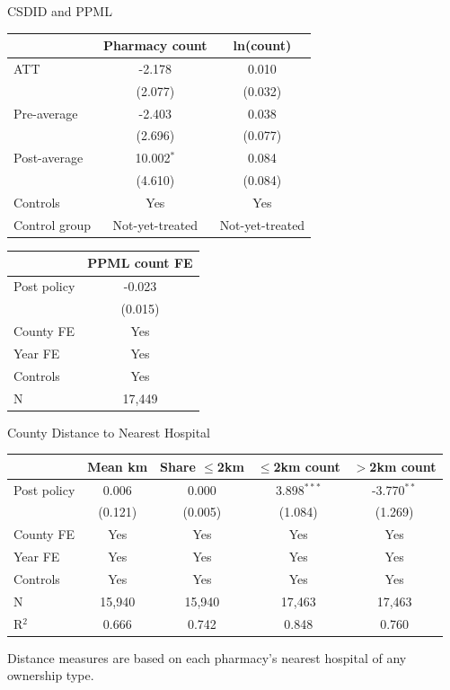 \documentclass{beamer}
\begin{document}
\begin{frame}{ CSDID and PPML}

\centering
\scriptsize
\setlength{\tabcolsep}{7pt}

\begin{tabular}{lcc}
\toprule
& Pharmacy count & ln(count) \\
\midrule
ATT
& -2.178 & 0.010 \\
& (2.077) & (0.032) \\
\addlinespace
Pre-average
& -2.403 & 0.038 \\
& (2.696) & (0.077) \\
\addlinespace
Post-average
& 10.002$^{*}$ & 0.084 \\
& (4.610) & (0.084) \\
\midrule
Controls & Yes & Yes \\
Control group & Not-yet-treated & Not-yet-treated \\
\bottomrule
\end{tabular}

\vspace{1em}

\begin{tabular}{lc}
\toprule
& PPML count FE \\
\midrule
Post policy
& -0.023 \\
& (0.015) \\
\midrule
County FE & Yes \\
Year FE & Yes \\
Controls & Yes \\
N & 17,449 \\
\bottomrule
\end{tabular}

\end{frame}

\begin{frame}{County Distance to Nearest Hospital}

\centering
\scriptsize
\setlength{\tabcolsep}{7pt}

\begin{tabular}{lcccc}
\toprule
& Mean km & Share $\leq$2km & $\leq$2km count & $>$2km count \\
\midrule
Post policy
& 0.006 & 0.000 & 3.898$^{***}$ & -3.770$^{**}$ \\
& (0.121) & (0.005) & (1.084) & (1.269) \\
\midrule
County FE & Yes & Yes & Yes & Yes \\
Year FE & Yes & Yes & Yes & Yes \\
Controls & Yes & Yes & Yes & Yes \\
\midrule
N & 15,940 & 15,940 & 17,463 & 17,463 \\
R$^2$ & 0.666 & 0.742 & 0.848 & 0.760 \\
\bottomrule
\end{tabular}

\vspace{0.6em}
\raggedright
\tiny Distance measures are based on each pharmacy's nearest hospital of any ownership type.

\end{frame}
\end{document}
